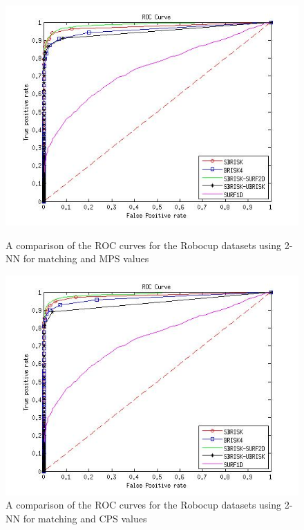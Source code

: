 \documentclass{report}
\begin{document}
\begin{figure}[h!]
\begin{minipage}[b]{0.5\linewidth}
\end{minipage}
\begin{minipage}[b]{0.5\linewidth}
\includegraphics[scale=0.4]{../Drawings/RobocupDataset/ROC_General_KNN_max.jpg}
\caption{A comparison of the ROC curves for the Robocup datasets using 2-NN for matching and MPS values}
\label{fig:compareKNN}
\end{minipage}
\begin{minipage}[b]{0.5\linewidth}
\includegraphics[scale=0.4]{../Drawings/RobocupDataset/ROC_General_KNN_consistent.jpg}
\caption{A comparison of the ROC curves for the Robocup datasets using 2-NN for matching and CPS values}
\label{fig:compareKNNConsist}
\end{minipage}
\end{figure}
\end{document}
